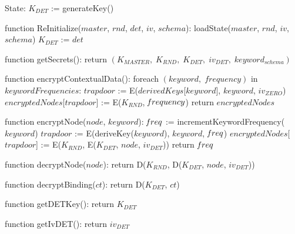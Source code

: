 State:
    $K_{DET}$ := generateKey()

function ReInitialize($master$, $rnd$, $det$, $iv$, $schema$):
    loadState($master$, $rnd$, $iv$, $schema$)
    $K_{DET}$ := $det$

function getSecrets():
    return $(K_{MASTER}, \; K_{RND}, \; K_{DET}, \; iv_{DET}, \; keyword_{schema})$

function encryptContextualData():
    foreach $(keyword, \; frequency)$ in $keywordFrequencies$:
        $trapdoor$ := E($derivedKeys$[$keyword$], $keyword$, $iv_{ZERO}$)
        $encryptedNodes$[$trapdoor$] := E($K_{RND}$, $\textrm{\emph{f}}requency$)
    return $encryptedNodes$

function encryptNode($node$, $keyword$):
    $\textrm{\emph{f}}req$ := incrementKeywordFrequency($keyword$)
    $trapdoor$ := E(deriveKey($keyword$), $keyword$, $\textrm{\emph{f}}req$)
    $encryptedNodes$[$trapdoor$] := E($K_{RND}$, E($K_{DET}$, $node$, $iv_{DET}$))
    return $\textrm{\emph{f}}req$
 
function decryptNode($node$):
    return D($K_{RND}$, D($K_{DET}$, $node$, $iv_{DET}$))

function decryptBinding($ct$):
    return D($K_{DET}$, $ct$)

function getDETKey():
    return $K_{DET}$

function getIvDET():
    return $iv_{DET}$
